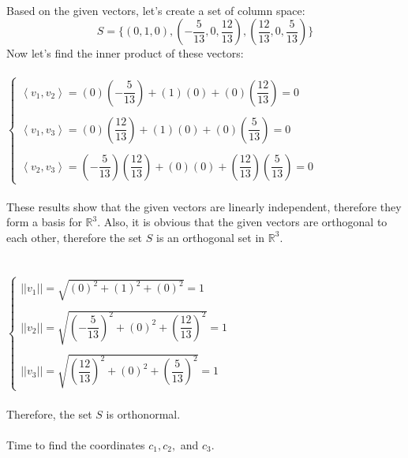 \documentclass[fleqn]{article}
\begin{document}
\begin{enumerate}
      \textcolor{hwColor}{
        \\
        Based on the given vectors, let's create a set of column space: 
        $$
          S=\{ \left(0, 1, 0\right), \left(-\dfrac{5}{13}, 0, \dfrac{12}{13}\right), \left(\dfrac{12}{13}, 0, \dfrac{5}{13}\right) \} 
        $$
        Now let's find the inner product of these vectors: 
        \\
        \\
        $
          \begin{cases}
            \left\langle v_1, v_2\right\rangle=(0)(-\dfrac{5}{13})+(1)(0)+(0)(\dfrac{12}{13})=0
            \\
            \\
            \left\langle v_1, v_3\right\rangle=(0)(\dfrac{12}{13})+(1)(0)+(0)(\dfrac{5}{13})=0
            \\
            \\
            \left\langle v_2, v_3\right\rangle=(-\dfrac{5}{13})(\dfrac{12}{13})+(0)(0)+(\dfrac{12}{13})(\dfrac{5}{13})=0
          \end{cases}
        $
        \\
        \\
        These results show that the given vectors are linearly independent, therefore they form a basis for $\mathbb{R}^3$.
        Also, it is obvious that the given vectors are orthogonal to each other, therefore the set $S$ is an orthogonal
        set in $\mathbb{R}^3$. 
        \\
        \\
        \\
        $
          \begin{cases}
            ||v_1||=\sqrt{(0)^2+(1)^2+(0)^2}=1
            \\
            \\
            ||v_2||=\sqrt{(-\dfrac{5}{13})^2+(0)^2+(\dfrac{12}{13})^2}=1
            \\
            \\
            ||v_3||=\sqrt{(\dfrac{12}{13})^2+(0)^2+(\dfrac{5}{13})^2}=1
          \end{cases}
        $
        \\
        \\
        Therefore, the set $S$ is orthonormal.
        \\
        \\
        Time to find the coordinates $c_1, c_2,$ and $c_3$.
        \\
        \\
}
\end{enumerate}
\end{document}
